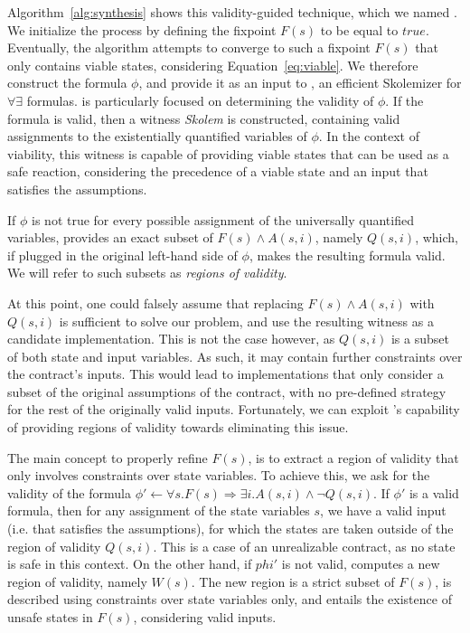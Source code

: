 Algorithm~\ref{alg:synthesis} shows this validity-guided technique, which we
named \jsynvg.
We initialize the process by defining the fixpoint $F(s)$ to be equal to $true$.
Eventually, the algorithm attempts to converge to such a fixpoint $F(s)$ that
only contains viable states, considering Equation~\ref{eq:viable}. We therefore
construct the formula $\phi$, and provide it as an input to \aeval, an efficient
Skolemizer for $\forall\exists$ formulas. \aeval is particularly focused on
determining the validity of $\phi$. If the formula is valid, then a witness
\textit{Skolem} is constructed, containing valid assignments to the
existentially quantified variables of $\phi$. In the context of viability, this
witness is capable of providing viable states that can be used as a safe
reaction, considering the precedence of a viable state and an input that
satisfies the assumptions.

If $\phi$ is not true for every possible assignment of the universally
quantified variables, \aeval provides an exact subset of $F(s) \land A(s,i)$, namely
$Q(s,i)$, which, if plugged in the original left-hand side of $\phi$, makes the
resulting formula valid. We will refer to such subsets as \textit{regions of
validity}.

At this point, one could falsely assume that replacing $F(s) \land A(s,i)$ with
$Q(s,i)$ is sufficient to solve our problem, and use the resulting witness as a
candidate implementation. This is not the case however, as $Q(s,i)$ is a subset
of both state and input variables. As such, it may contain further constraints
over the contract's inputs. This would lead to implementations that only
consider a subset of the original assumptions of the contract, with no
pre-defined strategy for the rest of the originally valid inputs.
Fortunately, we can exploit \aeval's capability of providing regions of validity
towards eliminating this issue.

The main concept to properly refine $F(s)$, is to extract a region of validity
that only involves constraints over state variables. To achieve this, we ask for
the validity of the formula $\phi' \gets \forall s. F(s) \Rightarrow \exists
i. A(s,i) \land \lnot Q(s,i)$. If $\phi'$ is a valid formula, then for any
assignment of the state variables $s$, we have a valid input (i.e. that
satisfies the assumptions), for which the states are taken outside of the region
of validity $Q(s,i)$. This is a case of an unrealizable contract, as no state is
safe in this context. On the other hand, if $phi'$ is not valid, \aeval computes
a new region of validity, namely $W(s)$. The new region is a strict subset of
$F(s)$, is described using constraints over state variables only, and entails
the existence of unsafe states in $F(s)$, considering valid inputs.

